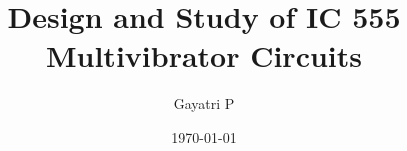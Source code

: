 \documentclass[reprint,amsmath,amssymb,aps]{revtex4-2}
\begin{document}
    \title{Design and Study of IC 555 Multivibrator Circuits}

    \author{Gayatri P}
    \date{\today}

    
    \maketitle

    
    
    
    
    \newpage

    
    \nocite{*}
\end{document}
